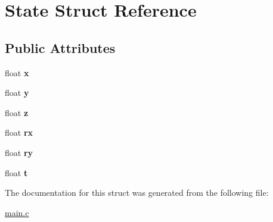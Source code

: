 \hypertarget{structState}{}\section{State Struct Reference}
\label{structState}
\subsection*{Public Attributes}
\begin{DoxyCompactItemize}
\item 
\mbox{\label{structState_a9948cc668f49246582cfd131b7928f7e}} 
float {\bfseries x}
\item 
\mbox{\label{structState_a89572abb38dea3b1a780ede589a2d59b}} 
float {\bfseries y}
\item 
\mbox{\label{structState_aed6ded85740f752ec9c5c2ca499da5a9}} 
float {\bfseries z}
\item 
\mbox{\label{structState_a44129661bc65bbbb6147793fd196c89f}} 
float {\bfseries rx}
\item 
\mbox{\label{structState_a9644786d1cc6a604052cc8eac719b888}} 
float {\bfseries ry}
\item 
\mbox{\label{structState_ab1a06cd5c56832f61483d897879e2b35}} 
float {\bfseries t}
\end{DoxyCompactItemize}


The documentation for this struct was generated from the following file\+:\begin{DoxyCompactItemize}
\item 
\hyperlink{main_8c}{main.\+c}\end{DoxyCompactItemize}
